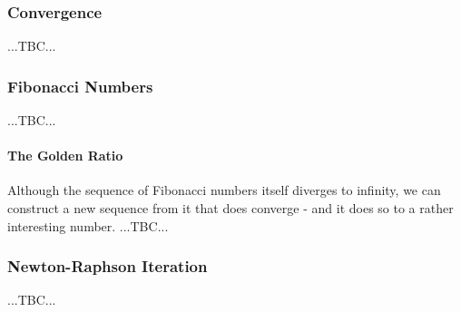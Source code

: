 


\subsubsection{Convergence}
...TBC...

\subsubsection{Fibonacci Numbers}
...TBC...



\paragraph{The Golden Ratio}
Although the sequence of Fibonacci numbers itself diverges to infinity, we can construct a new sequence from it that does converge - and it does so to a rather interesting number. ...TBC...


\subsubsection{Newton-Raphson Iteration}
...TBC...


